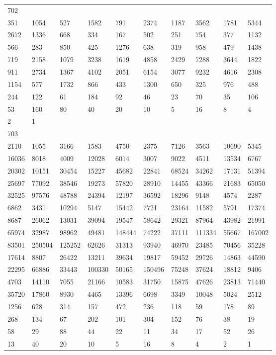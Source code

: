 \begin{longtable}{*{10}{l}}
702&&&&&&&&&\\
351& 1054& 527& 1582& 791& 2374& 1187& 3562& 1781& 5344\\
2672& 1336& 668& 334& 167& 502& 251& 754& 377& 1132\\
566& 283& 850& 425& 1276& 638& 319& 958& 479& 1438\\
719& 2158& 1079& 3238& 1619& 4858& 2429& 7288& 3644& 1822\\
911& 2734& 1367& 4102& 2051& 6154& 3077& 9232& 4616& 2308\\
1154& 577& 1732& 866& 433& 1300& 650& 325& 976& 488\\
244& 122& 61& 184& 92& 46& 23& 70& 35& 106\\
53& 160& 80& 40& 20& 10& 5& 16& 8& 4\\
2& 1& \\

703&&&&&&&&&\\
2110& 1055& 3166& 1583& 4750& 2375& 7126& 3563& 10690& 5345\\
16036& 8018& 4009& 12028& 6014& 3007& 9022& 4511& 13534& 6767\\
20302& 10151& 30454& 15227& 45682& 22841& 68524& 34262& 17131& 51394\\
25697& 77092& 38546& 19273& 57820& 28910& 14455& 43366& 21683& 65050\\
32525& 97576& 48788& 24394& 12197& 36592& 18296& 9148& 4574& 2287\\
6862& 3431& 10294& 5147& 15442& 7721& 23164& 11582& 5791& 17374\\
8687& 26062& 13031& 39094& 19547& 58642& 29321& 87964& 43982& 21991\\
65974& 32987& 98962& 49481& 148444& 74222& 37111& 111334& 55667& 167002\\
83501& 250504& 125252& 62626& 31313& 93940& 46970& 23485& 70456& 35228\\
17614& 8807& 26422& 13211& 39634& 19817& 59452& 29726& 14863& 44590\\
22295& 66886& 33443& 100330& 50165& 150496& 75248& 37624& 18812& 9406\\
4703& 14110& 7055& 21166& 10583& 31750& 15875& 47626& 23813& 71440\\
35720& 17860& 8930& 4465& 13396& 6698& 3349& 10048& 5024& 2512\\
1256& 628& 314& 157& 472& 236& 118& 59& 178& 89\\
268& 134& 67& 202& 101& 304& 152& 76& 38& 19\\
58& 29& 88& 44& 22& 11& 34& 17& 52& 26\\
13& 40& 20& 10& 5& 16& 8& 4& 2& 1\\


\end{longtable}

